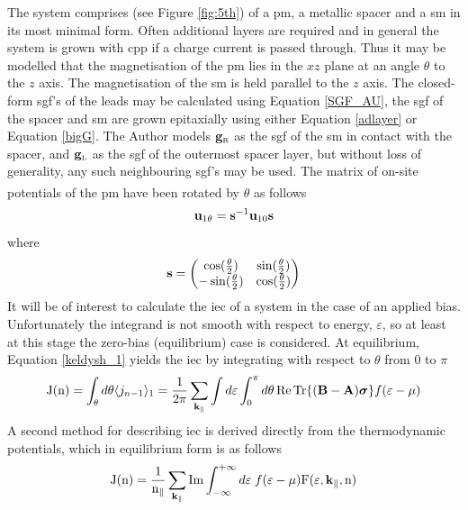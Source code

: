 \documentclass[a4paper, 12pt]{article}
\begin{document}
\par The system comprises (see Figure \ref{fig:5th}) of a \gls{pm}, a metallic spacer and a \gls{sm} in its most minimal form. Often additional layers are required and in general the system is grown with \gls{cpp} if a charge current is passed through. Thus it may be modelled that the magnetisation of the \gls{pm} lies in the $xz$ plane at an angle $\theta$ to the $z$ axis. The magnetisation of the \gls{sm} is held parallel to the $z$ axis. The closed-form \gls{sgf}'s of the leads may be calculated using Equation \eqref{SGF_AU}, the \gls{sgf} of the spacer and \gls{sm} are grown epitaxially using either Equation \eqref{adlayer} or Equation \eqref{bigG}.
The Author models $\bf g_{\rm\scriptscriptstyle R}$ as the \gls{sgf} of the \gls{sm} in contact with the spacer, and $\bf g_{\rm\scriptscriptstyle L}$ as the \gls{sgf} of the outermost spacer layer, but without loss of generality, any such neighbouring \gls{sgf}'s may be used.
The matrix of on-site potentials of the \gls{pm} have been rotated by $\theta$ as follows\textcolor{blue}{\textsuperscript{\cite{SC}}}
\begin{equation}
	\rm\bf u_{\rm 1 \theta}\; {\rm =}\; s^{\rm -1}u_{\rm 1 0}s
\end{equation}
where 
\begin{equation}
	{\bf s} = \begin{pmatrix} \cos(\frac{\theta}{2})&\sin(\frac{\theta}{2})\\-\sin(\frac{\theta}{2})&\cos(\frac{\theta}{2}) \end{pmatrix}
\end{equation}
It will be of interest to calculate the \gls{iec} of a system in the case of an applied bias. Unfortunately the integrand is not smooth with respect to energy, $\varepsilon$, so at least at this stage the zero-bias (equilibrium) case is considered.
At equilibrium, Equation \eqref{keldysh_1} yields the \gls{iec} by integrating with respect to $\theta$ from $0$ to $	\pi$
\begin{equation}\label{alt_exchange}
	{\rm J(n)}= \int_\theta d\theta \langle j_{n-1}\rangle_1 = \frac{1}{2\pi}\sum_{\bf k_\parallel}\int d\varepsilon \int_0^\pi d\theta\,\rm Re \, Tr \lbrace \bf (B-A)\bm\sigma\rbrace \mathnormal f(\varepsilon - \mu)
\end{equation}
A second method for describing \gls{iec} is derived directly from the thermodynamic potentials, which in equilibrium form is as follows
\begin{equation}\label{exchange}
	\rm J(n) = \frac{1}{n_\parallel}\sum_{\bf k_\parallel}Im\int_{-\infty}^{+\infty}{\mathnormal d}\varepsilon\;{\mathnormal f}(\varepsilon - \mu)F(\varepsilon, {\bf k_\parallel}, n)
\end{equation}
\end{document}

